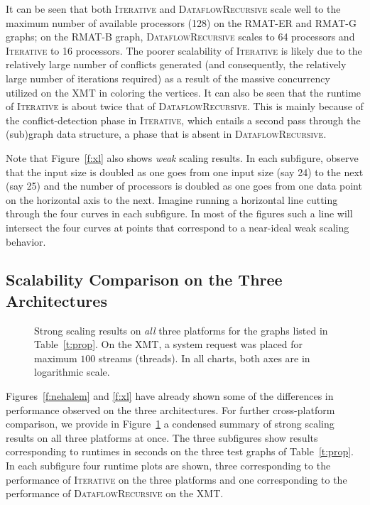 \documentclass{article}
\begin{document}
It can be seen that both \textsc{Iterative} and \textsc{DataflowRecursive} 
scale well to the maximum number of available processors (128) 
on the RMAT-ER and RMAT-G graphs; on the RMAT-B graph,
\textsc{DataflowRecursive} scales to 64 processors and  \textsc{Iterative} 
to 16 processors.
The poorer scalability of \textsc{Iterative} is likely due to the relatively large number of conflicts 
generated (and consequently, the relatively large number of iterations required) 
as a result of the massive concurrency utilized on the XMT in coloring the vertices.
It can also be seen that the runtime of \textsc{Iterative} is about twice that of \textsc{DataflowRecursive}.
This is mainly because of the conflict-detection phase in \textsc{Iterative}, 
which entails a second pass through the (sub)graph data structure, 
a phase that is absent in \textsc{DataflowRecursive}.

Note that Figure~\ref{f:xl} also shows {\em weak} scaling results. 
In each subfigure, observe that the input size is doubled as one goes 
from one input size (say 24) to the next (say 25) and the number of processors 
is doubled as one goes from one data point on the horizontal axis to the next.
Imagine running a horizontal line cutting through the four curves in each subfigure. 
In most of the figures such a line will intersect the four curves at points that correspond  
to a near-ideal weak scaling behavior.

 
\subsection{Scalability Comparison on the Three Architectures}
\label{sec:scalability-comp}

\begin{figure}
\centering
{}
\caption{\small Strong scaling results on {\em all}  three platforms for the graphs listed in 
Table~\ref{t:prop}.
On the XMT, a system request was placed for maximum $100$ streams (threads).
In all charts, both axes are in logarithmic scale.}
\label{f:all}
\end{figure}

Figures~\ref{f:nehalem} and \ref{f:xl} have already shown some
of the differences in performance observed on the three architectures.
For further cross-platform comparison, we provide in
Figure~\ref{f:all} a condensed summary of strong scaling results on all three platforms at once. 
The three subfigures show results corresponding to runtimes in seconds on
the three test graphs of Table~\ref{t:prop}.
In each subfigure four runtime plots are shown, 
three corresponding to the performance of \textsc{Iterative} on the
three platforms and one corresponding to the performance of 
\textsc{DataflowRecursive} on the XMT.
\end{document}
